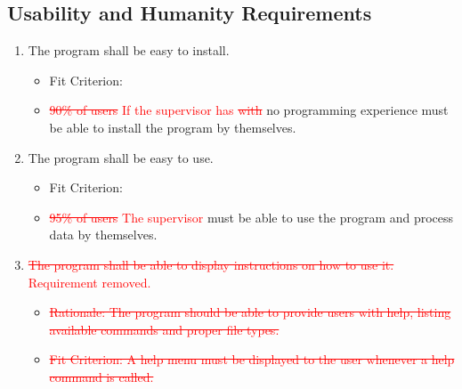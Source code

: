 \documentclass[12pt, titlepage]{article}
\begin{document}
\subsection{Usability and Humanity Requirements}
\begin{enumerate}[{UH}1. ]
\item \label{UH1} The program shall be easy to install.
    \begin{itemize}
        \item Fit Criterion: \item \textcolor{red}{\sout{90\% of users} If the supervisor has} \textcolor{red}{\sout{with}} no programming experience must be able to install the program by themselves.
\end{itemize}
\item \label{UH2} The program shall be easy to use.
    \begin{itemize}
        \item Fit Criterion: \item \textcolor{red}{\sout{95\% of users} The supervisor} must be able to use the program and process data by themselves.
\end{itemize}
\item \label{UH3} {\textcolor{red}{\sout{The program shall be able to display instructions on how to use it.} Requirement removed.}}
    \begin{itemize} 
        \item {\textcolor{red}{\sout{Rationale: The program should be able to provide users with help, listing available commands and proper file types.}}}
        \item {\textcolor{red}{\sout{Fit Criterion: A help menu must be displayed to the user whenever a help command is called.}}}
\end{itemize}
\end{enumerate}
\end{document}

